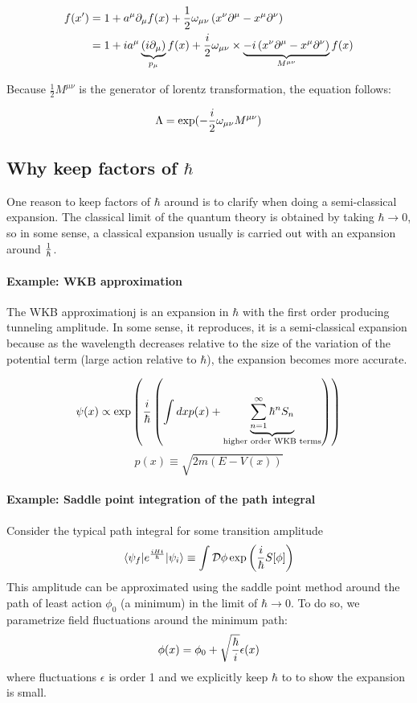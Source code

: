 \documentclass[11pt]{article}
\theoremstyle{definition}
\begin{document}
\begin{align}
f(x') &= 1 + a^\mu \partial_\mu f(x) + \frac12 \omega_{\mu \nu}  \left(x^\nu \partial^\mu - x^\mu \partial^\nu \right) \\
& = 1 + i a^\mu \underbrace{(i \partial_\mu)}_{p_\mu} f(x) + {i \over 2 } \omega_{\mu \nu} \times \underbrace{ -i \left(x^\nu \partial^\mu - x^\mu \partial^\nu \right)}_{M^{\mu \nu}} f(x)
\end{align}

Because $\frac12 M^{\mu \nu}$ is the generator of lorentz transformation, the equation follows:

\begin{align}
\Lambda = \exp(-{i \over 2} \omega_{\mu \nu} M^{\mu \nu} )
\end{align}


\subsection{Why keep factors of $\hbar$}

One reason to keep factors of $\hbar$ around is to clarify when doing a semi-classical expansion. The classical limit of the quantum theory is obtained by taking $\hbar \rightarrow 0$, so in some sense, a classical expansion usually is carried out with an expansion around ${1 \over \hbar}$.

\paragraph{Example: WKB approximation}

The WKB approximationj is an expansion in $\hbar$ with the first order producing tunneling amplitude.  In some sense, it reproduces, it is a semi-classical expansion because as the wavelength decreases relative to the size of the variation of the potential term (large action relative to $\hbar$), the expansion becomes more accurate.

$$\psi(x) \propto \exp \left({i \over \hbar} \left(\int dx p(x) + \underbrace{\sum_{n=1}^\infty \hbar^n S_n}_{\text{higher order WKB terms}}  \right) \right) $$
$$ p(x) \equiv \sqrt{2 m (E-V(x))}$$

\paragraph{Example: Saddle point integration of the path integral}

Consider the typical path integral for some transition amplitude
$$\braket{\psi_f | e^{i Ht \over \hbar} | \psi_i} \equiv \int \mathcal{D} \phi \exp\left( {i \over \hbar} S[\phi] \right)$$
This amplitude can be approximated using the saddle point method around the path of least action $\phi_0$ (a minimum) in the limit of $\hbar \rightarrow 0$.  To do so, we parametrize field fluctuations around the minimum path:
$$ \phi(x)=\phi_0 + \sqrt{\hbar \over i} \epsilon(x)$$
where fluctuations $\epsilon$ is order 1 and we explicitly keep $\hbar$ to to show the expansion is small.
\end{document}
